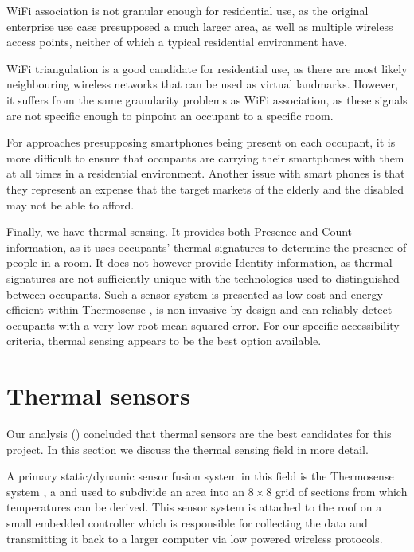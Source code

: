 \documentclass[../thesis/thesis.tex]{subfiles}
\begin{document}
WiFi association is not granular enough for residential use, as the original enterprise use case presupposed a much larger area, as well as multiple wireless access points, neither of which a typical residential environment have.

WiFi triangulation is a good candidate for residential use, as there are most likely neighbouring wireless networks that can be used as virtual landmarks. However, it suffers from the same granularity problems as WiFi association, as these signals are not specific enough to pinpoint an occupant to a specific room.

For approaches presupposing smartphones being present on each occupant, it is more difficult to ensure that occupants are carrying their smartphones with them at all times in a residential environment.  Another issue with smart phones is that they represent an expense that the target markets of the elderly and the disabled may not be able to afford.

Finally, we have thermal sensing. It provides both Presence and Count information, as it uses occupants' thermal signatures to determine the presence of people in a room. It does not however provide Identity information, as thermal signatures are not sufficiently unique with the technologies used to distinguished between occupants. Such a sensor system is presented as low-cost and energy efficient within Thermosense \cite{beltran2013thermosense}, is non-invasive by design and can reliably detect occupants with a very low root mean squared error. For our specific accessibility criteria, thermal sensing appears to be the best option available.

\section{Thermal sensors}
\label{sec:litreview:thermalsensors}
Our analysis () concluded that thermal sensors are the best candidates for this project. In this section we discuss the thermal sensing field in more detail.

A primary static/dynamic sensor fusion system in this field is the Thermosense system \cite{beltran2013thermosense}, a \pir and \iar used to subdivide an area into an $8\times8$ grid of sections from which temperatures can be derived. This sensor system is attached to the roof on a small embedded controller which is responsible for collecting the data and transmitting it back to a larger computer via low powered wireless protocols.
\end{document}
